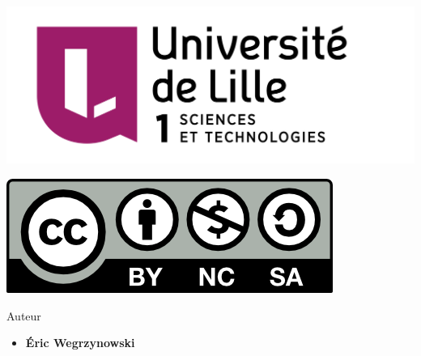 









\begin{frame}

\thispagestyle{empty}    

  \hspace*{-20ex}
  \begin{minipage}{0.55\textwidth}
  \begin{center}
    \vspace*{5ex}   


    \includegraphics[scale=0.13]{../divers/Logo-Univ-Lille-1-new.png}

    

    \vspace*{5ex}

    \includegraphics[scale=0.5]{../divers/by-nc-sa.png}
  \end{center}
  \end{minipage}
  \hfil
  \begin{minipage}{0.72\textwidth}
  \vspace*{5ex}
  Auteur
  \begin{itemize}
    \item {\bf \'Eric Wegrzynowski}
  \end{itemize}


\end{minipage}
\end{frame}
